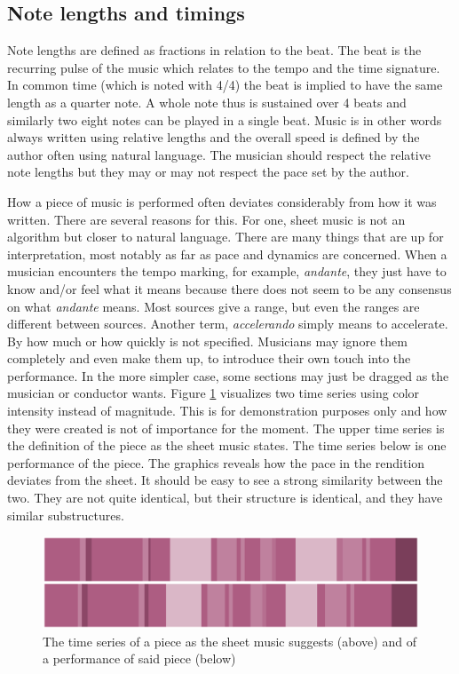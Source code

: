 \subsection{Note lengths and timings}
Note lengths are defined as fractions in relation to the beat. The beat is the recurring pulse of the music which relates to the tempo and the time signature. In common time (which is noted with 4/4) the beat is implied to have the same length as a quarter note. A whole note thus is sustained over 4 beats and similarly two eight notes can be played in a single beat. Music is in other words always written using relative lengths and the overall speed is defined by the author often using natural language. The musician should respect the relative note lengths but they may or may not respect the pace set by the author.  

How a piece of music is performed often deviates considerably from how it was written. There are several reasons for this. For one, sheet music is not an algorithm but closer to natural language. There are many things that are up for interpretation, most notably as far as pace and dynamics are concerned. When a musician encounters the tempo marking, for example, \textit{andante}, they just have to know and/or feel what it means because there does not seem to be any consensus on what \textit{andante} means. Most sources give a range, but even the ranges are different between sources. Another term, \textit{accelerando} simply means to accelerate. By how much or how quickly is not specified. Musicians may ignore them completely and even make them up, to introduce their own touch into the performance. In the more simpler case, some sections may just be dragged as the musician or conductor wants. Figure \ref{fig:performance-sheet} visualizes two time series using color intensity instead of magnitude. This is for demonstration purposes only and how they were created is not of importance for the moment. The upper time series is the definition of the piece as the sheet music states. The time series below is one performance of the piece. The graphics reveals how the pace in the rendition deviates from the sheet. It should be easy to see a strong similarity between the two. They are not quite identical, but their structure is identical, and they have similar substructures. 

\begin{figure}[ht]
    \centering
    \includegraphics[width=\textwidth]{./images/performance-sheet.png}
    \caption{The time series of a piece as the sheet music suggests (above) and of a performance of said piece (below)\label{fig:performance-sheet}}
\end{figure}

